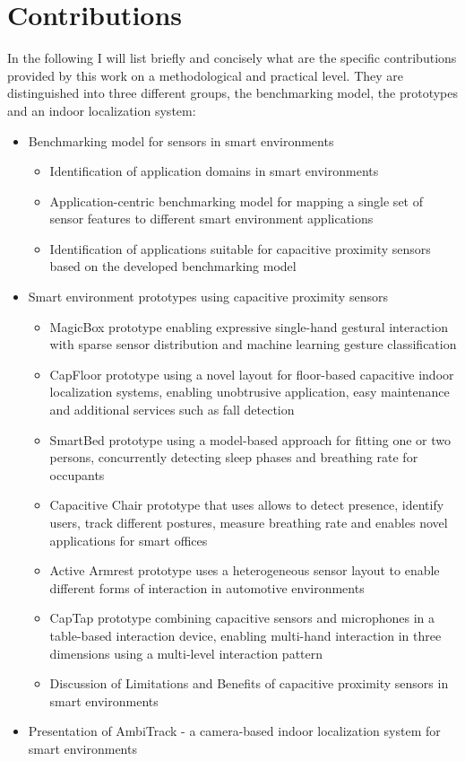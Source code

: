 \section{Contributions}
In the following I will list briefly and concisely what are the specific contributions provided by this work on a methodological and practical level. They are distinguished into three different groups, the benchmarking model, the prototypes and an indoor localization system: 
\begin{itemize}
\item Benchmarking model for sensors in smart environments
\begin{itemize}
\item Identification of application domains in smart environments
\item Application-centric benchmarking model for mapping a single set of sensor features to different smart environment applications
\item Identification of applications suitable for capacitive proximity sensors based on the developed benchmarking model
\end{itemize}
\item Smart environment prototypes using capacitive proximity sensors
\begin{itemize}
\item MagicBox prototype enabling expressive single-hand gestural interaction with sparse sensor distribution and machine learning gesture classification
\item CapFloor prototype using a novel layout for floor-based capacitive indoor localization systems, enabling unobtrusive application, easy maintenance and additional services such as fall detection
\item SmartBed prototype using a model-based approach for fitting one or two persons, concurrently detecting sleep phases and breathing rate for occupants
\item Capacitive Chair prototype that uses allows to detect presence, identify users, track different postures, measure breathing rate and enables novel applications for smart offices
\item Active Armrest prototype uses a heterogeneous sensor layout to enable different forms of interaction in automotive environments
\item CapTap prototype combining capacitive sensors and microphones in a table-based interaction device, enabling multi-hand interaction in three dimensions using a multi-level interaction pattern
\item Discussion of Limitations and Benefits of capacitive proximity sensors in smart environments
\end{itemize}
\item Presentation of AmbiTrack - a camera-based indoor localization system for smart environments
\end{itemize}

